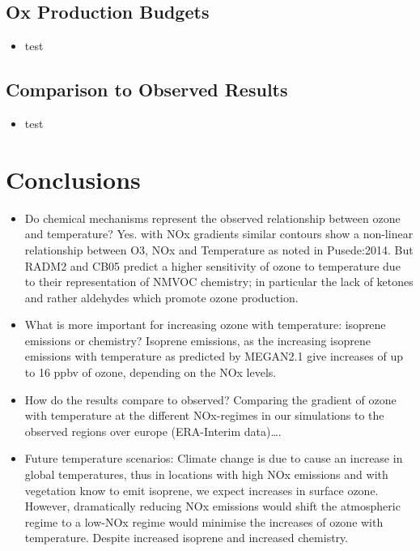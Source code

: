 \documentclass[11pt,a4paper]{article}
\begin{document}
\subsection{Ox Production Budgets}
\begin{itemize}
    \item test
\end{itemize}

\subsection{Comparison to Observed Results}
\begin{itemize}
    \item test
\end{itemize}

\section{Conclusions} \label{s:conclusions}
\begin{itemize}
    \item Do chemical mechanisms represent the observed relationship between ozone and temperature? Yes. with NOx gradients similar contours show a non-linear relationship between O3, NOx and Temperature as noted in Pusede:2014. But RADM2 and CB05 predict a higher sensitivity of ozone to temperature due to their representation of NMVOC chemistry; in particular the lack of ketones and rather aldehydes which promote ozone production.
    \item What is more important for increasing ozone with temperature: isoprene emissions or chemistry? Isoprene emissions, as the increasing isoprene emissions with temperature as predicted by MEGAN2.1 give increases of up to 16 ppbv of ozone, depending on the NOx levels.
    \item How do the results compare to observed? Comparing the gradient of ozone with temperature at the different NOx-regimes in our simulations to the observed regions over europe (ERA-Interim data)\dots.
    \item Future temperature scenarios: Climate change is due to cause an increase in global temperatures, thus in locations with high NOx emissions and with vegetation know to emit isoprene, we expect increases in surface ozone. However, dramatically reducing NOx emissions would shift the atmospheric regime to a low-NOx regime would minimise the increases of ozone with temperature. Despite increased isoprene and increased chemistry.
\end{itemize}


 
\end{document}
